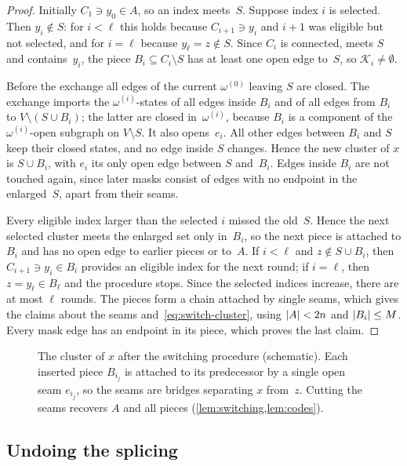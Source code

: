 \begin{proof}
Initially $C_1\ni y_0\in A$, so an index meets~$S$. Suppose index $i$ is selected. Then $y_i\notin S$:
for $i<\ell$ this holds because $C_{i+1}\ni y_i$ and $i+1$ was eligible but not selected, and for $i=\ell$
because $y_\ell=z\notin S$. Since $C_i$ is connected, meets $S$ and contains~$y_i$, the piece
$B_i\subseteq C_i\setminus S$ has at least one open edge to~$S$, so $\mathcal K_i\neq\emptyset$.

Before the exchange all edges of the current $\omega^{(0)}$ leaving $S$ are closed. The exchange
imports the $\omega^{(i)}$-states of all edges inside $B_i$ and of all edges from $B_i$ to
$V\setminus(S\cup B_i)$; the latter are closed in~$\omega^{(i)}$, because $B_i$ is a component
of the $\omega^{(i)}$-open subgraph on $V\setminus S$. It also opens~$e_i$. All other edges between
$B_i$ and $S$ keep their closed states, and no edge inside $S$ changes. Hence the new cluster of $x$ is
$S\cup B_i$, with $e_i$ its only open edge between $S$ and~$B_i$. Edges inside $B_i$ are not touched
again, since later masks consist of edges with no endpoint in the enlarged~$S$, apart from their seams.

Every eligible index larger than the selected $i$ missed the old~$S$. Hence the next selected cluster
meets the enlarged set only in~$B_i$, so the next piece is attached to $B_i$ and has no open edge to
earlier pieces or to~$A$. If $i<\ell$ and $z\notin S\cup B_i$, then $C_{i+1}\ni y_i\in B_i$ provides an
eligible index for the next round; if $i=\ell$, then $z=y_\ell\in B_\ell$ and the procedure stops. Since the
selected indices increase, there are at most $\ell$ rounds. The pieces form a chain attached by single
seams, which gives the claims about the seams and~\eqref{eq:switch-cluster}, using $\lvert A\rvert<2n$ and
$\lvert B_i\rvert\le M$. Every mask edge has an endpoint in its piece, which proves the last claim.
\end{proof}

\begin{figure}[t]
\centering

\caption{The cluster of $x$ after the switching procedure (schematic). Each inserted piece $B_{i_j}$ is
attached to its predecessor by a single open seam $e_{i_j}$, so the seams are bridges separating $x$
from~$z$. Cutting the seams recovers $A$ and all pieces (\cref{lem:switching,lem:codes}).}\label{fig:chain}
\end{figure}

\subsection{Undoing the splicing}\label{sec:codes}

